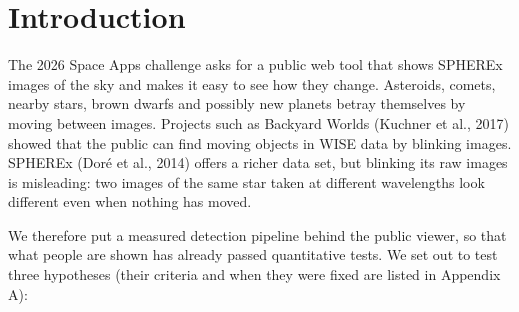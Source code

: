 \documentclass[twocolumn]{aastex631}
\begin{document}
\begin{abstract}
\medskip\noindent\textbf{Key points}
\begin{itemize}\setlength{\itemsep}{1pt}
\item A difference-imaging pipeline built for SPHEREx's linear variable filter matches references pixel by pixel in wavelength and detects moving sources in single 2-minute exposures.
\item A 0.32 M-parameter CNN trained only on injected movers separates 556 detections of real known asteroids in 19 fields it never trained on from false signals in the same fields with AUROC 0.987; signal-to-noise alone gives 0.537.
\item Fitting distance and orbital motion together across survey passes recovered 47 of 48 injected distant bodies (500--3000 AU) moving on circular orbits in fields with three survey passes (none in a two-pass field), with a median distance error of 0.09\%.
\item Positions of known asteroids agree with JPL Horizons predictions computed for the SPHEREx spacecraft to a median of 0.7$''$ (0.11 px, 78 detections of 6 objects).
\end{itemize}
\end{abstract}


\section{Introduction}
\label{sec:intro}
The 2026 Space Apps challenge asks for a public web tool that shows SPHEREx images of the sky and makes it easy to see how they change. Asteroids, comets, nearby stars, brown dwarfs and possibly new planets betray themselves by moving between images. Projects such as Backyard Worlds (Kuchner et al., 2017) showed that the public can find moving objects in WISE data by blinking images. SPHEREx (Doré et al., 2014) offers a richer data set, but blinking its raw images is misleading: two images of the same star taken at different wavelengths look different even when nothing has moved.

We therefore put a measured detection pipeline behind the public viewer, so that what people are shown has already passed quantitative tests. We set out to test three hypotheses (their criteria and when they were fixed are listed in Appendix A):
\end{document}
